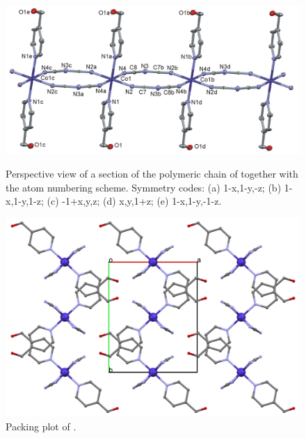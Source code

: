 \begin{figure}[htpb!]
\centering
\includegraphics[width=1\textwidth]{figures/CoD_4OMP_FIGm11-1.png}
\caption[Perspective view of ]{Perspective view of a section of the polymeric chain of  together with the atom numbering scheme. Symmetry codes: (a) 1-x,1-y,-z; (b) 1-x,1-y,1-z; (c) -1+x,y,z; (d) x,y,1+z; (e) 1-x,1-y,-1-z.}
\label{fig:CoD4HOMP_pv}
\vspace{\floatsep}
\includegraphics[width=1\textwidth]{figures/cod_4omp_CC-1.png}
\caption{Packing plot of .}
\label{fig:CoD4HOMP_packv}
\end{figure}





